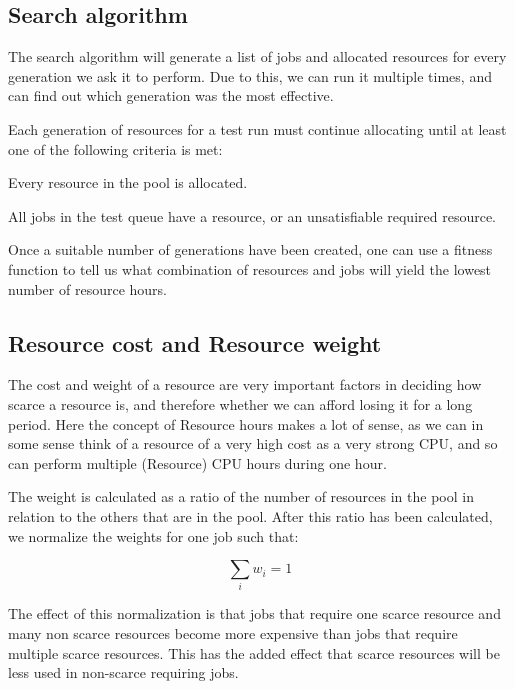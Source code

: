 \documentclass[twoside]{article}
\begin{document}
\begin{multicols}{2}
\section{Search algorithm}

The search algorithm will generate a list of jobs and allocated resources for
every generation we ask it to perform. Due to this, we can run it multiple
times, and can find out which generation was the most effective.

Each generation of resources for a test run must continue allocating until at
least one of the following criteria is met:

\begin{compactitem}
\item Every resource in the pool is allocated.
\item All jobs in the test queue have a resource, or an unsatisfiable required resource.
\end{compactitem}

Once a suitable number of generations have been created, one can use a fitness
function to tell us what combination of resources and jobs will yield the
lowest number of resource hours.



\subsection{Resource cost and Resource weight}

The cost and weight of a resource are very important factors in deciding how
scarce a resource is, and therefore whether we can afford losing it for a long
period. Here the concept of Resource hours makes a lot of sense, as we can in
some sense think of a resource of a very high cost as a very strong CPU, and so
can perform multiple (Resource) CPU hours during one hour.

The weight is calculated as a ratio of the number of resources in the pool in
relation to the others that are in the pool. After this ratio has been
calculated, we normalize the weights for one job such that:

\begin{equation}
\sum_{i}{w_{i}} = 1
\end{equation}

The effect of this normalization is that jobs that require one scarce resource
and many non scarce resources become more expensive than jobs that require
multiple scarce resources. This has the added effect that scarce resources will
be less used in non-scarce requiring jobs.


\end{multicols}
\end{document}
